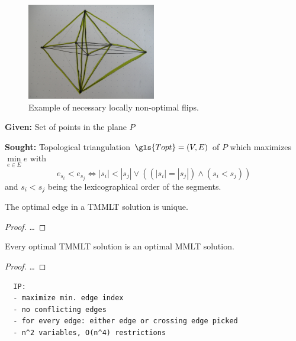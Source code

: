 \begin{figure}[ht]
  \centering
  \includegraphics[width=0.5\textwidth]{img/example_nonoptimal_flips.jpg}
  \caption{Example of necessary locally non-optimal flips.\label{fig:nonoptimal_flips}}
\end{figure}

\begin{problem}
  \hfill
  \begin{labeling}{\hspace{4em}}
    \item[\textbf{Given:}]
      Set of points in the plane \(P\)
    \item[\textbf{Sought:}]
      Topological triangulation \(\gls{Topt} = (V,E)\) of \(P\)
      which maximizes \(\min\limits_{e\in E} e\) with
      \[
        e_{s_i} < e_{s_j}
        \iff |s_i| < |s_j|
        \lor ((|s_i| = |s_j|) \land (s_i < s_j))
      \]
      and \( s_i < s_j \) being the lexicographical order of
      the segments.
  \end{labeling}
\end{problem}

\begin{theorem}
  The optimal edge in a \gls{TMMLT} solution is unique.
\end{theorem}

\begin{proof}
  \ldots{}
\end{proof}

\begin{theorem}
  Every optimal \gls{TMMLT} solution is an optimal \gls{MMLT} solution.
\end{theorem}

\begin{proof}
  \ldots{}
\end{proof}

\begin{verbatim}
  IP:
  - maximize min. edge index
  - no conflicting edges
  - for every edge: either edge or crossing edge picked
  - n^2 variables, O(n^4) restrictions
\end{verbatim}


